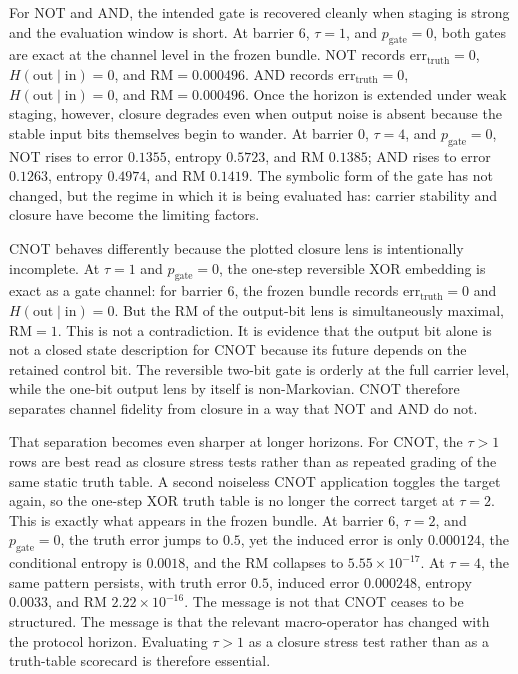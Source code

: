 \documentclass[11pt]{article}
\theoremstyle{definition}
\begin{document}
For NOT and AND, the intended gate is recovered cleanly when staging is strong and the evaluation window is short. At barrier \(6\), \(\tau=1\), and \(p_{\mathrm{gate}}=0\), both gates are exact at the channel level in the frozen bundle. NOT records \(\mathrm{err}_{\mathrm{truth}}=0\), \(H(\mathrm{out}\mid\mathrm{in})=0\), and \(\mathrm{RM}=0.000496\). AND records \(\mathrm{err}_{\mathrm{truth}}=0\), \(H(\mathrm{out}\mid\mathrm{in})=0\), and \(\mathrm{RM}=0.000496\). Once the horizon is extended under weak staging, however, closure degrades even when output noise is absent because the stable input bits themselves begin to wander. At barrier \(0\), \(\tau=4\), and \(p_{\mathrm{gate}}=0\), NOT rises to error \(0.1355\), entropy \(0.5723\), and RM \(0.1385\); AND rises to error \(0.1263\), entropy \(0.4974\), and RM \(0.1419\). The symbolic form of the gate has not changed, but the regime in which it is being evaluated has: carrier stability and closure have become the limiting factors.

CNOT behaves differently because the plotted closure lens is intentionally incomplete. At \(\tau=1\) and \(p_{\mathrm{gate}}=0\), the one-step reversible XOR embedding is exact as a gate channel: for barrier \(6\), the frozen bundle records \(\mathrm{err}_{\mathrm{truth}}=0\) and \(H(\mathrm{out}\mid\mathrm{in})=0\). But the RM of the output-bit lens is simultaneously maximal, \(\mathrm{RM}=1\). This is not a contradiction. It is evidence that the output bit alone is not a closed state description for CNOT because its future depends on the retained control bit. The reversible two-bit gate is orderly at the full carrier level, while the one-bit output lens by itself is non-Markovian. CNOT therefore separates channel fidelity from closure in a way that NOT and AND do not.

That separation becomes even sharper at longer horizons. For CNOT, the \(\tau>1\) rows are best read as closure stress tests rather than as repeated grading of the same static truth table. A second noiseless CNOT application toggles the target again, so the one-step XOR truth table is no longer the correct target at \(\tau=2\). This is exactly what appears in the frozen bundle. At barrier \(6\), \(\tau=2\), and \(p_{\mathrm{gate}}=0\), the truth error jumps to \(0.5\), yet the induced error is only \(0.000124\), the conditional entropy is \(0.0018\), and the RM collapses to \(5.55\times 10^{-17}\). At \(\tau=4\), the same pattern persists, with truth error \(0.5\), induced error \(0.000248\), entropy \(0.0033\), and RM \(2.22\times 10^{-16}\). The message is not that CNOT ceases to be structured. The message is that the relevant macro-operator has changed with the protocol horizon. Evaluating \(\tau>1\) as a closure stress test rather than as a truth-table scorecard is therefore essential.
\end{document}
